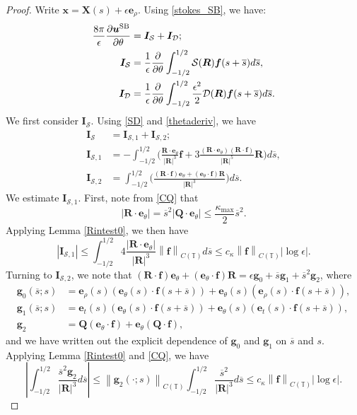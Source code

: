 \documentclass[11pt]{article}
\numberwithin{equation}{section}
\newcommand{\T}{\mathbb{T}}
\newcommand{\bars}{\overline s}
\newcommand{\bu}{\bm{u}}
\newcommand{\bx}{\bm{x}}
\newcommand{\X}{\bm{X}}
\newcommand{\be}{\bm{e}}
\newcommand{\p}{\partial}
\newcommand{\SB}{{\rm SB}}
\newcommand{\abs}[1]{\left\lvert #1 \right\rvert}
\newcommand{\norm}[1]{\left\lVert #1 \right\rVert}
\newcommand{\mc}[1]{\mathcal{#1}}
\theoremstyle{definition}
\begin{document}
\begin{proof} 
Write $\bx=\X(s)+\epsilon \be_\rho$. Using \eqref{stokes_SB}, we have:
\begin{equation}\label{ISDtheta}
\begin{split}
\frac{8\pi}{\epsilon}\frac{\p\bu^{\SB}}{\p \theta} &=\bm{I}_{\mc{S}}+\bm{I}_{\mc{D}}; \\
\bm{I}_\mc{S}&=\frac{1}{\epsilon}\frac{\p}{\p\theta}\int_{-1/2}^{1/2}\mc{S}(\bm{R})\bm{f}(s+\bars) d\bars,\\
\bm{I}_\mc{D}&=\frac{1}{\epsilon}\frac{\p}{\p\theta}\int_{-1/2}^{1/2}\frac{\epsilon^2}{2}\mc{D}(\bm{R})\bm{f}(s+\bars) d\bars.
\end{split}
\end{equation}
We first consider $\bm{I}_{\mc{S}}$. Using \eqref{SD} and \eqref{thetaderiv}, we have
\begin{align*}
\bm{I}_{\mc{S}} &=\bm{I}_{\mc{S},1}+\bm{I}_{\mc{S},2};\\
\bm{I}_{\mc{S},1} &=-\int_{-1/2}^{1/2} \bigg(\frac{\bm{R}\cdot\be_\theta}{\abs{\bm{R}}^3}\bm{f}
+3\frac{(\bm{R}\cdot\be_\theta)(\bm{R}\cdot\bm{f})}{\abs{\bm{R}}^5}\bm{R} \bigg)d\bars,\\
\bm{I}_{\mc{S},2}&=\int_{-1/2}^{1/2} \bigg(\frac{(\bm{R}\cdot \bm{f})\be_\theta+(\be_\theta\cdot \bm{f})\bm{R}}{\abs{\bm{R}}^3}\bigg)d\bars.
\end{align*}
We estimate $\bm{I}_{\mc{S},1}$. First, note from \eqref{CQ} that
\[\abs{\bm{R}\cdot \be_\theta}=\bars^2\abs{\bm{Q}\cdot \be_\theta}\le \frac{\kappa_{\max}}{2}\bars^2. \]
Applying Lemma \ref{Rintest0}, we then have
\begin{equation}\label{IS1}
\abs{\bm{I}_{\mc{S},1}}\le \int_{-1/2}^{1/2}4\frac{\abs{\bm{R}\cdot\be_\theta}}{\abs{\bm{R}}^3}\norm{\bm{f}}_{C(\T)} d\bars \le c_\kappa\norm{\bm{f}}_{C(\T)}\abs{\log \epsilon}.
\end{equation}
Turning to $\bm{I}_{\mc{S},2}$, we note that $(\bm{R}\cdot \bm{f})\be_\theta+(\be_\theta\cdot \bm{f})\bm{R}=\epsilon \bm{g}_0+\bars\bm{g}_1+\bars^2\bm{g}_2$, where
\begin{equation}\label{g012def}
\begin{split}
\bm{g}_0(\bars;s) &=\be_\rho(s)(\be_\theta(s)\cdot \bm{f}(s+\bars))+ \be_\theta(s)(\be_\rho(s)\cdot \bm{f}(s+\bars)),\\
\bm{g}_1(\bars;s) &=\be_t(s)(\be_\theta(s)\cdot \bm{f}(s+\bars))+ \be_\theta(s)(\be_t(s)\cdot \bm{f}(s+\bars)),\\
\bm{g}_2 &=\bm{Q}(\be_\theta\cdot \bm{f})+\be_\theta(\bm{Q}\cdot \bm{f}),
\end{split}
\end{equation}
and we have written out the explicit dependence of $\bm{g}_0$ and $\bm{g}_1$ on $\bars$ and $s$. Applying Lemma \ref{Rintest0} and \eqref{CQ}, we have
\[\abs{\int_{-1/2}^{1/2} \frac{\bars^2 \bm{g}_2}{\abs{\bm{R}}^3}d\bars}
\le \norm{\bm{g}_2(\cdot;s)}_{C(\T)}\int_{-1/2}^{1/2} \frac{\bars^2}{\abs{\bm{R}}^3}d\bars
\le c_\kappa\norm{\bm{f}}_{C(\T)}\abs{\log \epsilon}. \]


\end{proof}
\end{document}

